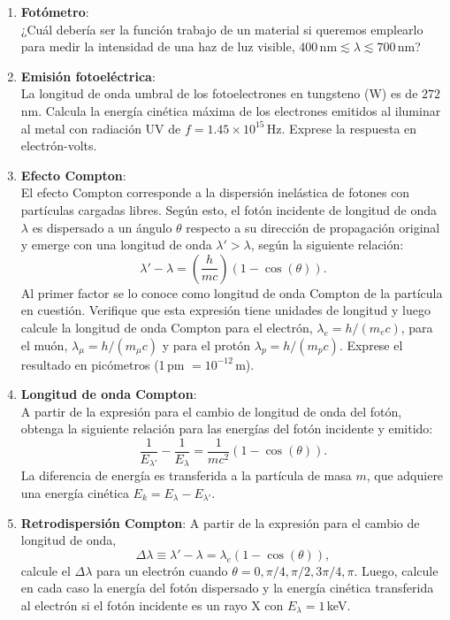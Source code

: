 \documentclass[a4paper,12pt]{article}
\begin{document}
\begin{enumerate}
\item {\bf{Fotómetro}}:\\
	¿Cuál debería ser la función trabajo de un material si queremos emplearlo
	para medir la intensidad de una haz de luz visible, $400$\,nm$\lesssim
	\lambda \lesssim 700$\,nm?

\item {\bf{Emisión fotoeléctrica}}:\\
	La longitud de onda umbral de los fotoelectrones en tungsteno (W) es de
	$272$\,nm. Calcula la energía cinética máxima de los electrones emitidos al
	iluminar al metal con radiación UV de $f=1.45\times 10^{15}$\,Hz. Exprese
	la respuesta en electrón-volts.

\item {\bf{Efecto Compton}}:\\
	El efecto Compton corresponde a la dispersión inelástica de fotones con
	partículas cargadas libres. Según esto, el fotón incidente de longitud de
	onda $\lambda$ es dispersado a un ángulo $\theta$ respecto a su dirección
	de propagación original y emerge con una longitud de onda $\lambda' >
	\lambda$, según la siguiente relación: $$ \lambda' - \lambda =
	\left(\frac{h}{mc}\right) \left ( 1 - \cos(\theta) \right ).$$ Al primer
	factor se lo conoce como longitud de onda Compton de la partícula en
	cuestión. Verifique que esta expresión tiene unidades de longitud y luego
	calcule la longitud de onda Compton para el electrón, $\lambda_e = h / (m_e
	c)$, para el muón, $\lambda_\mu = h / (m_\mu c)$ y para el protón
	$\lambda_p = h / (m_p c)$. Exprese el resultado en picómetros (1\,pm $=
	10^{-12}$\,m).

\item {\bf{Longitud de onda Compton}}:\\
	A partir de la expresión para el cambio de longitud de onda del fotón,
	obtenga la siguiente relación para las energías del fotón incidente y
	emitido: $$\frac{1}{E_{\lambda'}} - \frac{1}{E_\lambda} = \frac{1}{m c^2}
	\left(1 - \cos(\theta) \right).$$ La diferencia de energía es transferida a
	la partícula de masa $m$, que adquiere una energía cinética $E_k =
	E_\lambda - E_{\lambda'}$. 

\item {\bf{Retrodispersión Compton}}:
	A partir de la expresión para el cambio de longitud de onda, $$ \Delta
	\lambda \equiv \lambda' - \lambda = \lambda_e \left ( 1 - \cos(\theta)
	\right ),$$ calcule el $\Delta \lambda$ para un electrón cuando $\theta =
	0, \pi/4, \pi/2, 3\pi/4, \pi$. Luego, calcule en cada caso la energía del
	fotón dispersado y la energía cinética transferida al electrón si el fotón
	incidente es un rayo X con $E_\lambda = 1$\,keV. 


\end{enumerate}
\end{document}
